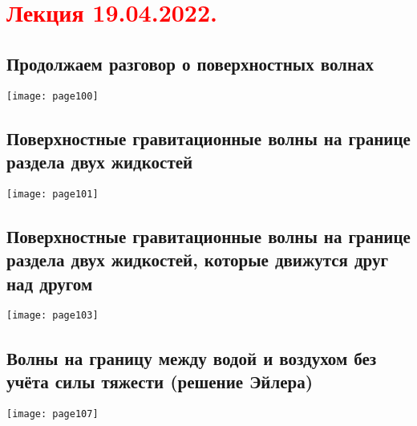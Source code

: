 \documentclass[main.tex]{subfiles}
\begin{document}
\section{\textcolor{red}{Лекция 19.04.2022.}}

\subsection{Продолжаем разговор о поверхностных волнах}
\texttt{[image: page100]}

\subsection{Поверхностные гравитационные волны на границе раздела двух жидкостей}
\texttt{[image: page101]}


\subsection{Поверхностные гравитационные волны на границе раздела двух жидкостей, которые движутся друг над другом}
\texttt{[image: page103]}




\subsection{Волны на границу между водой и воздухом без учёта силы тяжести (решение Эйлера)}
\texttt{[image: page107]}

\end{document}
